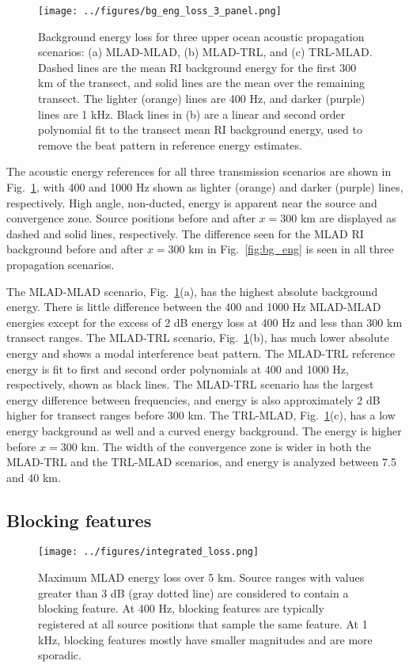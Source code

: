 \documentclass[preprint,NumberedRefs]{JASA}
\begin{document}
\begin{figure}
\texttt{[image: ../figures/bg\_eng\_loss\_3\_panel.png]}
        \caption{Background energy loss for three upper ocean acoustic propagation scenarios: (a) MLAD-MLAD, (b) MLAD-TRL, and (c) TRL-MLAD. Dashed lines are the mean RI background energy for the first 300 km of the transect, and solid lines are the mean over the remaining transect. The lighter (orange) lines are 400 Hz, and darker (purple) lines are 1 kHz. Black lines in (b) are a linear and second order polynomial fit to the transect mean RI background energy, used to remove the beat pattern in reference energy estimates.}
    \label{fig:eng_bg_3}
\end{figure}
The acoustic energy references for all three transmission scenarios are shown in Fig.~\ref{fig:eng_bg_3}, with 400 and 1000 Hz shown as lighter (orange) and darker (purple) lines, respectively. High angle, non-ducted, energy is apparent near the source and convergence zone. Source positions before and after $x=300$ km are displayed as dashed and solid lines, respectively. The difference seen for the MLAD RI background before and after $x=300$ km in Fig.~\ref{fig:bg_eng} is seen in all three propagation scenarios.

The MLAD-MLAD scenario, Fig.~\ref{fig:eng_bg_3}(a), has the highest absolute background energy. There is little difference between the 400 and 1000 Hz MLAD-MLAD energies except for the excess of 2 dB energy loss at 400 Hz and less than 300 km transect ranges. The MLAD-TRL scenario, Fig.~\ref{fig:eng_bg_3}(b), has much lower absolute energy and shows a modal interference beat pattern. The MLAD-TRL reference energy is fit to first and second order polynomials at 400 and 1000 Hz, respectively, shown as black lines. The MLAD-TRL scenario has the largest energy difference between frequencies, and energy is also approximately 2 dB higher for transect ranges before 300 km. The TRL-MLAD, Fig.~\ref{fig:eng_bg_3}(c), has a low energy background as well and a curved energy background. The energy is higher before $x=300$ km. The width of the convergence zone is wider in both the MLAD-TRL and the TRL-MLAD scenarios, and energy is analyzed between 7.5 and 40 km.

\subsection{Blocking features}\label{ssec:blocking}
\begin{figure}
\texttt{[image: ../figures/integrated\_loss.png]}
    \caption{Maximum MLAD energy loss over 5 km. Source ranges with values greater than 3 dB (gray dotted line) are considered to contain a blocking feature. At 400 Hz, blocking features are typically registered at all source positions that sample the same feature. At 1 kHz, blocking features mostly have smaller magnitudes and are more sporadic.}
    \label{fig:blocking}
\end{figure}
\end{document}
